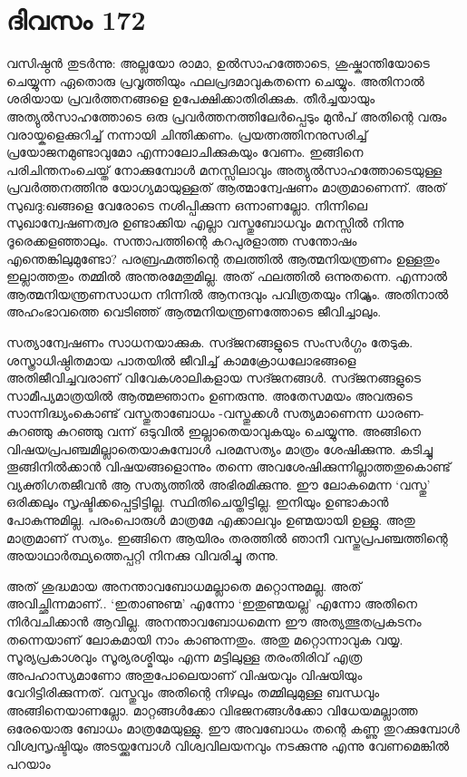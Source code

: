 \section{ദിവസം 172}


വസിഷ്ഠൻ തുടർന്നു: അല്ലയോ രാമാ, ഉൽസാഹത്തോടെ, ശുഷ്കാന്തിയോടെ ചെയ്യുന്ന ഏതൊരു പ്രവൃത്തിയും ഫലപ്രദമാവുകതന്നെ ചെയ്യും. അതിനാൽ ശരിയായ പ്രവർത്തനങ്ങളെ ഉപേക്ഷിക്കാതിരിക്കുക. തീർച്ചയായും അത്യുൽസാഹത്തോടെ ഒരു പ്രവർത്തനത്തിലേർപ്പെടും മുൻപ് അതിന്റെ വരും വരായ്കളെക്കുറിച്ച് നന്നായി ചിന്തിക്കണം. പ്രയത്നത്തിനനുസരിച്ച് പ്രയോജനമുണ്ടാവുമോ എന്നാലോചിക്കുകയും വേണം. ഇങ്ങിനെ പരിചിന്തനംചെയ്ത് നോക്കുമ്പോൾ മനസ്സിലാവും അത്യുൽസാഹത്തോടെയുള്ള പ്രവർത്തനത്തിനു യോഗ്യമായുള്ളത് ആത്മാന്വേഷണം മാത്രമാണെന്ന്. അത് സുഖദു:ഖങ്ങളെ വേരോടെ നശിപ്പിക്കുന്ന ഒന്നാണല്ലോ. നിന്നിലെ സുഖാന്വേഷണത്വര ഉണ്ടാക്കിയ എല്ലാ വസ്തുബോധവും മനസ്സിൽ നിന്നു ദൂരെക്കളഞ്ഞാലും. സന്താപത്തിന്റെ കറപുരളാത്ത സന്തോഷം എന്തെങ്കിലുമുണ്ടോ? പരബ്രഹ്മത്തിന്റെ തലത്തിൽ ആത്മനിയന്ത്രണം ഉള്ളതും ഇല്ലാത്തതും തമ്മിൽ അന്തരമേതുമില്ല. അത് ഫലത്തിൽ ഒന്നുതന്നെ. എന്നാൽ ആത്മനിയന്ത്രണസാധന നിന്നിൽ ആനന്ദവും പവിത്രതയും നിറ്യ്ക്കും. അതിനാൽ അഹംഭാവത്തെ വെടിഞ്ഞ് ആത്മനിയന്ത്രണത്തോടെ ജീവിച്ചാലും.

സത്യാന്വേഷണം സാധനയാക്കുക. സദ്ജനങ്ങളുടെ സംസർഗ്ഗം തേടുക. ശസ്ത്രാധിഷ്ഠിതമായ പാതയിൽ ജീവിച്ച് കാമക്രോധലോഭങ്ങളെ അതിജീവിച്ചവരാണ്‌ വിവേകശാലികളായ സദ്ജനങ്ങൾ. സദ്ജനങ്ങളുടെ സാമീപ്യമാത്രയിൽ ആത്മജ്ഞാനം ഉണരുന്നു. അതേസമയം അവരുടെ സാന്നിദ്ധ്യംകൊണ്ട് വസ്തുതാബോധം -വസ്തുക്കൾ സത്യമാണെന്ന ധാരണ- കുറഞ്ഞു കുറഞ്ഞു വന്ന് ഒടുവിൽ ഇല്ലാതെയാവുകയും ചെയ്യുന്നു. അങ്ങിനെ വിഷയപ്രപഞ്ചമില്ലാതെയാകുമ്പോൾ പരമസത്യം മാത്രം ശേഷിക്കുന്നു. കടിച്ചു തൂങ്ങിനിൽക്കാൻ വിഷയങ്ങളൊന്നും തന്നെ അവശേഷിക്കുന്നില്ലാത്തതുകൊണ്ട് വ്യക്തിഗതജീവൻ ആ സത്യത്തിൽ അഭിരമിക്കുന്നു. ഈ ലോകമെന്ന ‘വസ്തു’ ഒരിക്കലും സൃഷ്ടിക്കപ്പെട്ടിട്ടില്ല. സ്ഥിതിചെയ്തിട്ടില്ല. ഇനിയും ഉണ്ടാകാൻ പോകുന്നുമില്ല. പരംപൊരുള്‍ മാത്രമേ എക്കാലവും ഉണ്മയായി ഉള്ളു. അതു മാത്രമാണ്‌ സത്യം. ഇങ്ങിനെ ആയിരം തരത്തിൽ ഞാനീ വസ്തുപ്രപഞ്ചത്തിന്റെ അയാഥാർത്ഥ്യത്തെപ്പറ്റി നിനക്കു വിവരിച്ചു തന്നു.

അത് ശുദ്ധമായ അനന്താവബോധമല്ലാതെ മറ്റൊന്നുമല്ല. അത് അവിച്ഛിന്നമാണ്‌.. ‘ഇതാണുണ്മ’ എന്നോ ‘ഇതുണ്മയല്ല’ എന്നോ അതിനെ നിര്‍വചിക്കാന്‍ ആവില്ല. അനന്താവബോധമെന്ന ഈ അത്യത്ഭുതപ്രകടനം തന്നെയാണ്‌ ലോകമായി നാം കാണുന്നതും. അതു മറ്റൊന്നാവുക വയ്യ. സൂര്യപ്രകാശവും സൂര്യരശ്മിയും എന്ന മട്ടിലുള്ള തരംതിരിവ് എത്ര അപഹാസ്യമാണോ അതുപോലെയാണ്‌ വിഷയവും വിഷയിയും വേറിട്ടിരിക്കുന്നത്. വസ്തുവും അതിന്റെ നിഴലും തമ്മിലുമുള്ള ബന്ധവും അങ്ങിനെയാണല്ലോ. മാറ്റങ്ങൾക്കോ വിഭജനങ്ങൾക്കോ വിധേയമല്ലാത്ത ഒരേയൊരു ബോധം മാത്രമേയുള്ളു. ഈ അവബോധം തന്റെ കണ്ണു തുറക്കുമ്പോൾ വിശ്വസൃഷ്ടിയും അടയ്ക്കുമ്പോൾ വിശ്വവിലയനവും നടക്കുന്നു എന്നു വേണമെങ്കിൽ പറയാം 

